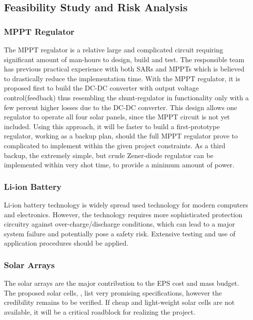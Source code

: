 \subsection{Feasibility Study and Risk Analysis}
%
\subsubsection*{MPPT Regulator}
The \ac{MPPT} regulator is a relative large and complicated circuit requiring significant amount of man-hours to design, build and test. The responsible team has previous practical experience with both \acp{SAR} and \acp{MPPT} which is believed to drastically reduce the implementation time. With the \ac{MPPT} regulator, it is proposed first to build the DC-DC converter with output voltage control(feedback) thus resembling the shunt-regulator in functionality only with a few percent higher losses due to the DC-DC converter. This design allows one regulator to operate all four solar panels, since the \ac{MPPT} circuit is not yet included. Using this approach, it will be faster to build a first-prototype regulator, working as a backup plan, should the full \ac{MPPT} regulator prove to complicated to implement within the given project constraints. As a third backup, the extremely simple, but crude Zener-diode regulator can be implemented within very shot time, to provide a minimum amount of power.
%
\subsubsection*{Li-ion Battery}
Li-ion battery technology is widely spread used technology for modern computers and electronics. However, the technology requires more sophisticated protection circuitry against over-charge/discharge conditions, which can lead to a major system failure and potentially pose a safety risk. Extensive testing and use of application procedures should be applied.
%
\subsubsection*{Solar Arrays}
The solar arrays are the major contribution to the \ac{EPS} cost and mass budget. The proposed solar cells, \cite{MC_Solar_Cell}, list very promising specifications, however the credibility remains to be verified. If cheap and light-weight solar cells are not available, it will be a critical roadblock for realizing the project.
%
%
